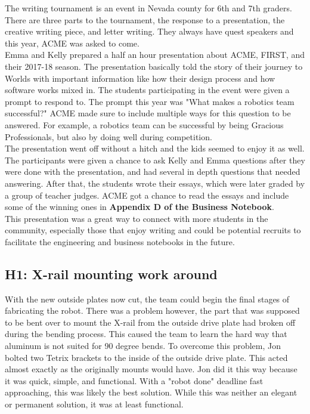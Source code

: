 \documentclass{article}
\begin{document}
The writing tournament is an event in Nevada county for 6th and 7th graders. There are three parts to the tournament, the response to a presentation, the creative writing piece, and letter writing. They always have quest speakers and this year, ACME was asked to come. \\

Emma and Kelly prepared a half an hour presentation about ACME, FIRST, and  their 2017-18 season. The presentation basically told the story of their journey to Worlds with important information like how their design process and how software works mixed in. The students participating in the event were given a prompt to respond to. The prompt this year was "What makes a robotics team successful?" ACME made sure to include multiple ways for this question to be answered. For example, a robotics team can be successful by being Gracious Professionals, but also by doing well during competition. \\

The presentation went off without a hitch and the kids seemed to enjoy it as well. The participants were given a chance to ask Kelly and Emma questions after they were done with the presentation, and had several in depth questions that needed answering. After that, the students wrote their essays, which were later graded by a group of teacher judges. ACME got a chance to read the essays and include some of the winning ones in \textbf{Appendix D of the Business Notebook}. \\

This presentation was a great way to connect with more students in the community, especially those that enjoy writing and could be potential recruits to facilitate the engineering and business notebooks in the future. \\


\subsection{H1: X-rail mounting work around}

With the new outside plates now cut, the team could begin the final stages of fabricating the robot. There was a problem however, the part that was supposed to be bent over to mount the X-rail from the outside drive plate had broken off during the bending process. This caused the team to learn the hard way that aluminum is not suited for 90 degree bends. To overcome this problem, Jon bolted two Tetrix brackets to the inside of the outside drive plate. This acted almost exactly as the originally mounts would have. Jon did it this way because it was quick, simple, and functional. With a "robot done" deadline fast approaching, this was likely the best solution. While this was neither an elegant or permanent solution, it was at least functional.
\end{document}
